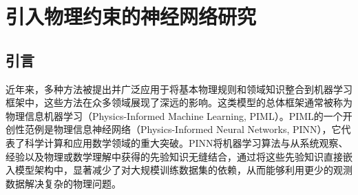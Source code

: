 \section{引入物理约束的神经网络研究}
\subsection{引言}
近年来，多种方法被提出并广泛应用于将基本物理规则和领域知识整合到机器学习框架中，这些方法在众多领域展现了深远的影响。这类模型的总体框架通常被称为物理信息机器学习（Physics-Informed Machine Learning, PIML）。PIML的一个开创性范例是物理信息神经网络（Physics-Informed Neural Networks, PINN），它代表了科学计算和应用数学领域的重大突破\cite{karniadakisPhysicsinformedMachineLearning2021,raissiPhysicsinformedNeuralNetworks2019a}。PINN将机器学习算法与从系统观察、经验以及物理或数学理解中获得的先验知识无缝结合，通过将这些先验知识直接嵌入模型架构中，显著减少了对大规模训练数据集的依赖，从而能够利用更少的观测数据解决复杂的物理问题。

